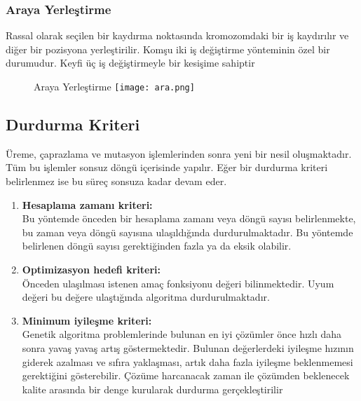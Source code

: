 \documentclass[12pt, a4paper]{article}
\begin{document}
\begin{flushleft}
	\subsubsection{Araya Yerleştirme}	
	Rassal olarak seçilen bir kaydırma noktasında kromozomdaki bir iş kaydırılır 
	ve diğer bir pozisyona yerleştirilir. Komşu iki iş değiştirme yönteminin özel bir 
	durumudur. Keyfi üç iş değiştirmeyle bir kesişime sahiptir
	\begin{figure}[h]
		{   Araya Yerleştirme}
		\centering
		\texttt{[image: ara.png]}
		\\[10pt]
	\end{figure}
	
	\subsection{ Durdurma Kriteri}
	Üreme, çaprazlama ve mutasyon işlemlerinden sonra yeni bir nesil
	oluşmaktadır. Tüm bu işlemler sonsuz döngü içerisinde yapılır. Eğer bir durdurma 
	kriteri belirlenmez ise bu süreç sonsuza kadar devam eder.
	\begin{enumerate}[label=\Alph*.]
		\item \textbf{Hesaplama zamanı kriteri:}\\
		Bu yöntemde önceden bir hesaplama zamanı 
		veya döngü sayısı belirlenmekte, bu zaman veya döngü sayısına ulaşıldığında 
		durdurulmaktadır. Bu yöntemde belirlenen döngü sayısı gerektiğinden fazla ya da 
		eksik olabilir.
		\item \textbf{ Optimizasyon hedefi kriteri:}\\
		Önceden ulaşılması istenen amaç fonksiyonu 
		değeri bilinmektedir. Uyum değeri bu değere ulaştığında algoritma 
		durdurulmaktadır.
		\item \textbf{Minimum iyileşme kriteri:}\\
		Genetik algoritma problemlerinde bulunan en iyi 
		çözümler önce hızlı daha sonra yavaş yavaş artış göstermektedir. Bulunan 
		değerlerdeki iyileşme hızının giderek azalması ve sıfıra yaklaşması, artık daha fazla 
		iyileşme beklenmemesi gerektiğini gösterebilir. Çözüme harcanacak zaman ile 
		çözümden beklenecek kalite arasında bir denge kurularak durdurma gerçekleştirilir\cite{birougul2005genetik} \\[5pt]
	\end{enumerate}
	
	

\end{flushleft}
\end{document}
